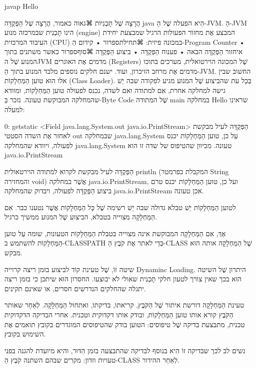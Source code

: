 javap Hello
\END

הֲרָצָה שֶׁל תָּכְנִיּוֹת ⌘גאוה
כאמור, הֲרָצָה שֶׁל הַפְּקֻדָּה java הִיא הפעלה שֶׁל הַ-JVM. הַ-JVM הינו
תָּכְנִית שבמרכזה מנוע (engine) המבצע אֶת מחזוֹר הפעולות הרגיל שמבצעת יחידת
העיבוד המרכזית (CPU) במכונה פיזית:
⌘תחילת{ספרור}
• קידום הַ-Program Counter
• איחזור הַפְּקֻדָּה הבאה
• פענוח הַפְּקֻדָּה
• ביצוע הַפְּקֻדָּה
⌘סוף{ספרור}
כאשר משתנים בתוך המנוע שֶׁל הJVM מדמים אֶת האוגרים (Registers) שֶׁל המכונה
הוירטואלית, מערכים בתוכו מדמים אֶת מרחב הזיכרון, ועוד.
ישנם חלקים נוספים מלבד המנוע בתוך הַ-JVM. החשוב שבין אלו הוּא טוען הַמַּחְלָקוֹת
(Class Loader). בְּכָל עת שהביצוע שֶׁל המנוע מגיע לפקודה שבה יֵשׁ גישה למחלקה
אחרת, אִם למתודה ואם לשדה, נכנס לפעולה טוען הַמַּחְלָקוֹת, ומוודא שהמחלקה
המבוקשת טעונה.
נזכר בַּ-Byte Code שֶׁל המתודה main במחלקה Hello שראינו למעלה:

  0: getstatic <Field java.lang.System.out java.io.PrintStream>
הַפְּקֻדָּה לעיל מבקשת לאחזר אֶת השדה הסטטי out שבמחלקה java.lang.System עַל כן,
טוען הַמַּחְלָקוֹת יכנס לפעולה, ויוודא שהמחלקה java.lang.System טעונה. מכיוון
שהטיפוס של שדה זו הוא java.io.PrintStream

הַפְּקֻדָּה לעיל מבקשת לקרוא למתודה הוירטאולית println (המקבלת כפרמטר String
והמחזירה void) אֲשֶׁר במחלקה java.io.PrintStream, ועל כן, טוען הַמַּחְלָקוֹת
יכנס טרם ביצוע הַפְּקֻדָּה לפעולה, ויבדוק שהמחלקה java.io.PrintStream אכן טעונה.

לטוען הַמַּחְלָקוֹת יֵשׁ טבלא גדולה שבה יֵשׁ רשימה שֶׁל כָּל הַמַּחְלָקוֹת
אֲשֶׁר נטענו כבר. אִם הַמַּחְלָקָה מצוייה בטבלא, הביצוע שֶׁל המנוע ממשיך כרגיל.

אַךְ, אִם הַמַּחְלָקָה המבוקשת אינה מצוייה בטבלת הַמַּחְלָקוֹת הטעונות, שומה עַל
טוען הַמַּחְלָקוֹת להשתמש ב-CLASSPATH כְּדֵי לאתר אֶת קֹבֶץ הַ-CLASS שֶׁל
הַמַּחְלָקָה אותה הוּא מבקש.

שיטה זוֹ, שֶׁל טעינת קוֹד לביצוע בזמן ריצה קרוייה Dynaminc Loading. היתרון שֶׁל השיטה
הוּא בכך שאין צורך לטעון חלקי תָּכְנִית שאולי לֹא יבוצעו. החסרון הוּא שיתכן כי בזמן
ריצה יתגלה שהחלקים הנדרשים חסרים, או שאינם תקינים.

טעינת הַמַּחְלָקָה דורשת איתור שֶׁל הַקֹּבֶץ, קריאתו, בדיקתו, ואתחול הַמַּחְלָקָה. לְאַחַר שאותר
הַקֹּבֶץ קורא אותו טוען הַמַּחְלָקוֹת, ובודק אותו דקדוקית וטכנית. אחרי הבדיקה הדקדוקית
טכנית, מתבצעת בדיקה שֶׁל טיפוסים: הטוען בודק שהטיפוסים המוגדרים בקובץ תואמים אֶת
השימוש בקובץ.

נשים לב לכך שבדיקה זוֹ הִיא בנוסף לבדיקה שהתבצעה בזמן הִדּוּר, והיא מיועדת להגנה
בפני טעויות וזדון: מקרים שבהם השתנה קֹבֶץ הַ-CLASS לְאַחַר ההידור.

